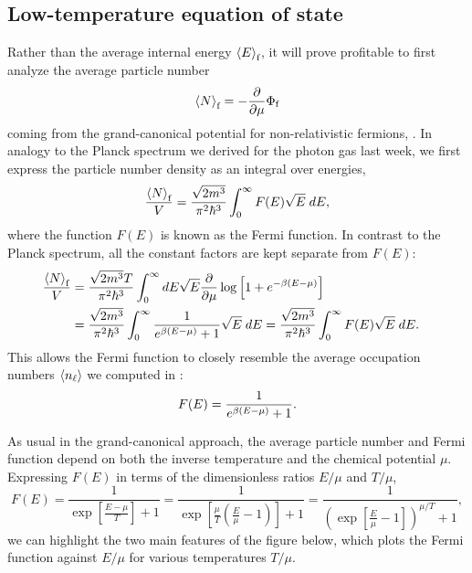 \subsection{Low-temperature equation of state}
Rather than the average internal energy $\left\langle E \right\rangle_{\text{f}}$, it will prove profitable to first analyze the average particle number
\begin{equation*}
  \left\langle N \right\rangle_{\text{f}} = -\frac{\partial }{\partial \mu} \Phi_{\text{f}}
\end{equation*}
coming from the grand-canonical potential for non-relativistic fermions, .
In analogy to the Planck spectrum we derived for the photon gas last week, we first express the particle number density as an integral over energies,
\begin{equation*}
  \frac{\left\langle N \right\rangle_{\text{f}}}{V} = \frac{\sqrt{2m^3}}{\pi^2 \hbar^3} \int_0^{\infty} F(E) \sqrt{E} \; dE,
\end{equation*}
where the function $F(E)$ is known as the Fermi function.
In contrast to the Planck spectrum, all the constant factors are kept separate from $F(E)$:
\begin{align}
  \frac{\left\langle N \right\rangle_{\text{f}}}{V} & = \frac{\sqrt{2m^3} T}{\pi^2 \hbar^3} \int_0^{\infty} dE \sqrt{E} \frac{\partial }{\partial \mu} \log\left[1 + e^{-\beta(E - \mu)}\right] \cr
                               & = \frac{\sqrt{2m^3}}{\pi^2 \hbar^3} \int_0^{\infty} \frac{1}{e^{\beta(E - \mu)} + 1} \sqrt{E} \; dE = \frac{\sqrt{2m^3}}{\pi^2 \hbar^3} \int_0^{\infty} F(E) \sqrt{E} \; dE. \label{eq:N_fermi}
\end{align}
This allows the Fermi function to closely resemble the average occupation numbers $\left\langle n_{\ell} \right\rangle$ we computed in :
\begin{equation}
  F(E) = \frac{1}{e^{\beta(E - \mu)} + 1}.
\end{equation}

As usual in the grand-canonical approach, the average particle number and Fermi function depend on both the inverse temperature \be and the chemical potential $\mu$.
Expressing $F(E)$ in terms of the dimensionless ratios $E / \mu$ and $T / \mu$,
\begin{equation*}
  F(E) = \frac{1}{\exp\left[\frac{E - \mu}{T}\right] + 1} = \frac{1}{\exp\left[\frac{\mu}{T}\left(\frac{E}{\mu} - 1\right)\right] + 1} = \frac{1}{\left(\exp\left[\frac{E}{\mu} - 1\right]\right)^{\mu / T} + 1},
\end{equation*}
we can highlight the two main features of the figure below, which plots the Fermi function against $E / \mu$ for various temperatures $T / \mu$.

